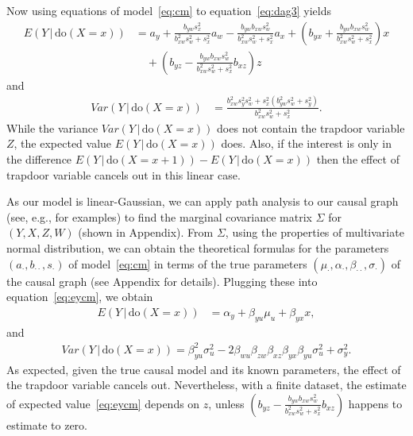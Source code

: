 \documentclass[11pt,a4paper,twoside]{article}
\newcommand{\+}[1]{\ensuremath{\mathbf{#1}}}
\newcommand{\doo}{\textrm{do}}
\newcommand{\given}{{ \, | \, }}
\newcommand{\z}{trapdoor variable}
\begin{document}
	Now using equations of model~\eqref{eq:cm} to equation~\eqref{eq:dag3} yields
	\begin{equation} 
	\label{eq:eycm}
	\begin{aligned}
	E(Y \given  \doo(X = x)) &= 
	a_y + \frac{b_{yw}s_x^2}{b_{xw}^2 s_w^2+s_x^2}a_w - \frac{b_{yw}b_{xw}s_w^2}{b_{xw}^2 s_w^2+s_x^2}a_x
	+ \left(b_{yx} + \frac{b_{yw} b_{xw} s_w^2}{b_{xw}^2 s_w^2+s_x^2}\right)x\\
	&\quad+ \left(b_{yz} -\frac{b_{yw} b_{xw} s_w^2}{b_{xw}^2 s_w^2+s_x^2}b_{xz}\right)z
	\end{aligned}
	\end{equation}
	and
	\begin{equation*}
	\begin{aligned}
	Var(Y \given  \doo(X = x)) &= \frac{b_{xw}^2 s_y^2 s_w^2+s_x^2 \left(b_{yw}^2 s_w^2+s_y^2\right)}{b_{xw}^2 s_w^2+s_x^2}.
	\end{aligned}
	\end{equation*}
	While the variance $Var(Y \given  \doo(X = x))$ does not contain the \z{} $Z$, the expected value $E(Y \given  \doo(X = x))$ does. Also, if the interest is only in the difference $E(Y \given \doo(X = x+1)) - E(Y \given \doo(X = x))$ then the effect of \z{} cancels out in this linear case.
	
	As our model is linear-Gaussian, we can apply path analysis \citep{wright1934} to our causal graph (see, e.g., \citet{Pearl2013} for examples) to find the marginal covariance matrix $\Sigma$ for $(Y, X, Z, W)$ (shown in Appendix). From $\Sigma$, using the properties of multivariate normal distribution, we can obtain the theoretical formulas for the parameters $(a_{\cdot}, b_{\cdot\cdot}, s_{\cdot})$ of model~\eqref{eq:cm} in terms of the true parameters $(\mu_{\cdot}, \alpha_{\cdot},\beta_{\cdot\cdot},\sigma_{\cdot})$ of the causal graph (see Appendix for details). Plugging these into equation~\eqref{eq:eycm}, we obtain
	\begin{equation*}
	\begin{aligned}
	E(Y \given  \doo(X = x)) &= \alpha_y + \beta_{yu}\mu_u + \beta_{yx} x,
	\end{aligned}
	\end{equation*}
	and
	\begin{equation*}
	\begin{aligned}
	Var(Y \given  \doo(X = x)) = \beta_{yu}^2\sigma_u^2 - 2\beta_{wu}\beta_{zw}\beta_{xz}\beta_{yx}\beta_{yu}\sigma_u^2 + \sigma_y^2.
	\end{aligned}
	\end{equation*}
	As expected, given the true causal model and its known parameters, the effect of the \z{} cancels out. Nevertheless, with a finite dataset, the estimate of expected value~\eqref{eq:eycm} depends on $z$, unless $\left(b_{yz} -\frac{b_{yw} b_{xw} s_w^2}{b_{xw}^2 s_w^2+s_x^2}b_{xz}\right)$ happens to estimate to zero.
	
\end{document}
